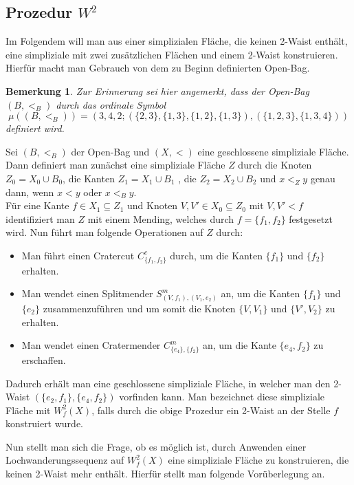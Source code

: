 \documentclass[12pt,titlepage]{article}
\newtheorem{bemerkung}{Bemerkung}[section]
\begin{document}
 \subsection{Prozedur $W^2$}
Im Folgendem will man aus einer simplizialen Fläche, die keinen 2-Waist enthält, eine simpliziale mit zwei zusätzlichen Flächen und einem 2-Waist konstruieren. Hierfür macht man Gebrauch von dem zu Beginn definierten Open-Bag.
\begin{bemerkung}
Zur Erinnerung sei hier angemerkt, dass der Open-Bag $(B,<_B)$ durch das ordinale Symbol 
\[
\mu((B,<_B))=(3,4,2;(\{2,3\},\{1,3\},\{1,2\},\{1,3\}),(\{1,2,3\},\{1,3,4\}))
\] definiert wird.
\end{bemerkung}
 
Sei $(B,<_B)$ der Open-Bag und $(X,<)$ eine geschlossene simpliziale Fläche. Dann definiert man zunächst eine simpliziale Fläche $Z$ durch die Knoten $Z_0=X_0 \cup B_0$, die Kanten $Z_1=X_1 \cup B_1$ , die $Z_2=X_2 \cup B_2$ und $x<_Z y$ genau dann, wenn $x<y$ oder $x<_B y$.\\
Für eine Kante $f\in X_1 \subseteq Z_1$ und Knoten $V,V'\in X_0\subseteq Z_0$ mit $V,V'<f$ identifiziert man $Z$ mit einem Mending, welches durch $f=\{f_1,f_2\}$ festgesetzt wird.
 Nun führt man folgende Operationen auf $Z$ durch:
\begin{itemize}
\item Man führt einen Cratercut $C_{\{f_1,f_2\}}^c$ durch, um die Kanten $\{f_1\}$ und $\{f_2\}$ erhalten.
\item Man wendet einen Splitmender $S^m_{(V,{f_1}),(V_1,e_2)}$ an, um die Kanten $\{f_1\}$ und $\{e_2\}$ zusammenzuführen und um somit die Knoten $\{V,V_1\}$ und $\{V',V_2\}$ zu erhalten.
\item Man wendet einen Cratermender $C_{\{e_4\},\{f_2\}}^m$ an, um die Kante $\{e_4,f_2\}$ zu erschaffen.
\end{itemize}
Dadurch erhält man eine geschlossene simpliziale Fläche, in welcher man den 2-Waist $(\{e_2,f_1\},\{e_4,f_2\})$ vorfinden kann. Man bezeichnet diese simpliziale Fläche mit \emph{$W^2_f(X)$}, falls durch die obige Prozedur ein 2-Waist an der Stelle $f$ konstruiert wurde.

 Nun stellt man sich die Frage, ob es möglich ist, durch Anwenden einer Lochwanderungssequenz auf $W^2_f(X)$ eine simpliziale Fläche zu konstruieren, die keinen 2-Waist mehr enthält. Hierfür stellt man folgende Vorüberlegung an.
 
\end{document}

